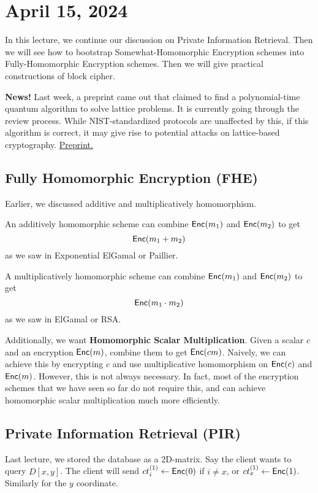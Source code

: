 \section{April 15, 2024}
\label{20240415}

In this lecture, we continue our discussion on Private Information Retrieval. Then we will see how to bootstrap Somewhat-Homomorphic Encryption schemes into Fully-Homomorphic Encryption schemes. Then we will give practical constructions of block cipher.

\begin{remark}
    \textbf{News!} Last week, a preprint came out that claimed to find a polynomial-time quantum algorithm to solve lattice problems. It is currently going through the review process. While NIST-standardized protocols are unaffected by this, if this algorithm is correct, it may give rise to potential attacks on lattice-based cryptography. \href{https://eprint.iacr.org/2024/555}{Preprint.}
\end{remark}

\subsection{Fully Homomorphic Encryption (FHE)}

Earlier, we discussed additive and multiplicatively homomorphism.

An additively homomorphic scheme can combine $\operatorname{\mathsf{Enc}}(m_1)$ and $\operatorname{\mathsf{Enc}}(m_2)$ to get
\[\operatorname{\mathsf{Enc}}(m_1 + m_2)\]
as we saw in Exponential ElGamal or Paillier.

A multiplicatively homomorphic scheme can combine $\operatorname{\mathsf{Enc}}(m_1)$ and $\operatorname{\mathsf{Enc}}(m_2)$ to get
\[\operatorname{\mathsf{Enc}}(m_1 \cdot m_2)\]
as we saw in ElGamal or RSA.

Additionally, we want \textbf{Homomorphic Scalar Multiplication}. Given a scalar $c$ and an encryption $\operatorname{\mathsf{Enc}}(m)$, combine them to get $\operatorname{\mathsf{Enc}}(cm)$. Naively, we can achieve this by encrypting $c$ and use multiplicative homomorphism on $\operatorname{\mathsf{Enc}}(c)$ and $\operatorname{\mathsf{Enc}}(m)$. However, this is not always necessary. In fact, most of the encryption schemes that we have seen so far do not require this, and can achieve homomorphic scalar multiplication much more efficiently.

\subsection{Private Information Retrieval (PIR)}

Last lecture, we stored the database as a 2D-matrix. Say the client wants to query $D[x,y]$. The client will send $ct_i^{(1)}\leftarrow \operatorname{\mathsf{Enc}}(0)$ if $i\neq x$, or $ct_x^{(1)}\leftarrow \operatorname{\mathsf{Enc}}(1)$. Similarly for the $y$ coordinate.

